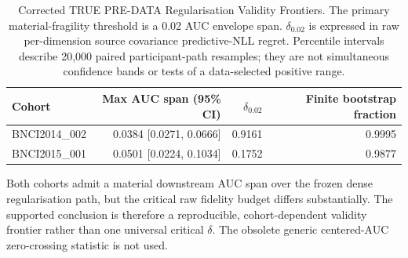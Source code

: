 \begin{table}[t]
\centering
\caption{Corrected TRUE PRE-DATA Regularisation Validity Frontiers. The primary material-fragility threshold is a 0.02 AUC envelope span. $\delta_{0.02}$ is expressed in raw per-dimension source covariance predictive-NLL regret. Percentile intervals describe 20,000 paired participant-path resamples; they are not simultaneous confidence bands or tests of a data-selected positive range.}
\label{tab:validity-frontier}
\small
\begin{tabular}{lrrr}
\hline
Cohort & Max AUC span (95\% CI) & $\delta_{0.02}$ & Finite bootstrap fraction \\
\hline
BNCI2014\_002
& 0.0384 [0.0271, 0.0666]
& 0.9161
& 0.9995 \\
BNCI2015\_001
& 0.0501 [0.0224, 0.1034]
& 0.1752
& 0.9877 \\
\hline
\end{tabular}

\vspace{1mm}
\footnotesize
Both cohorts admit a material downstream AUC span over the frozen dense regularisation path, but the critical raw fidelity budget differs substantially. The supported conclusion is therefore a reproducible, cohort-dependent validity frontier rather than one universal critical $\delta$. The obsolete generic centered-AUC zero-crossing statistic is not used.
\end{table}
